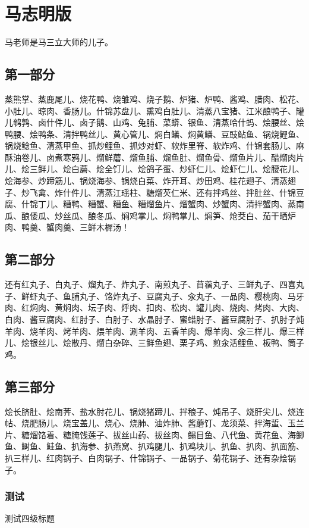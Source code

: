 \section{马志明版}
马老师是马三立大师的儿子。
\subsection{第一部分}
蒸熊掌、蒸鹿尾儿、烧花鸭、烧雏鸡、烧子鹅、炉猪、炉鸭、酱鸡、腊肉、松花、小肚儿、晾肉、香肠儿。什锦苏盘儿、熏鸡白肚儿、清蒸八宝猪、江米酿鸭子、罐儿鹌鹑、卤什件儿、卤子鹅、山鸡、兔脯、菜蟒、银鱼、清蒸哈什蚂、烩腰丝、烩鸭腰、烩鸭条、清拌鸭丝儿、黄心管儿、焖白鳝、焖黄鳝、豆豉鲇鱼、锅烧鲤鱼、锅烧鲶鱼、清蒸甲鱼、抓炒鲤鱼、抓炒对虾、软炸里脊、软炸鸡、什锦套肠儿、麻酥油卷儿、卤煮寒鸦儿、熘鲜蘑、熘鱼脯、熘鱼肚、熘鱼骨、熘鱼片儿、醋熘肉片儿、烩三鲜儿、烩白蘑、烩全饤儿、烩鸽子蛋、炒虾仁儿、烩虾仁儿、烩腰花儿、烩海参、炒蹄筋儿、锅烧海参、锅烧白菜、炸开耳、炒田鸡、桂花翅子、清蒸翅子、炒飞禽、炸什件儿、清蒸江瑶柱、糖熘芡仁米、还有拌鸡丝、拌肚丝、什锦豆腐、什锦丁儿、糟鸭、糟蟹、糟鱼、糟熘鱼片、熘蟹肉、炒蟹肉、清拌蟹肉、蒸南瓜、酿倭瓜、炒丝瓜、酿冬瓜、焖鸡掌儿、焖鸭掌儿、焖笋、炝茭白、茄干晒炉肉、鸭羹、蟹肉羹、三鲜木樨汤！

\subsection{第二部分}
还有红丸子、白丸子、熘丸子、炸丸子、南煎丸子、苜蓿丸子、三鲜丸子、四喜丸子、鲜虾丸子、鱼脯丸子、饹炸丸子、豆腐丸子、汆丸子、一品肉、樱桃肉、马牙肉、红焖肉、黄焖肉、坛子肉、烀肉、扣肉、松肉、罐儿肉、烧肉、烤肉、大肉、白肉、酱豆腐肉、红肘子、白肘子、水晶肘子、蜜蜡肘子、酱豆腐肘子、扒肘子炖羊肉、烧羊肉、烤羊肉、煨羊肉、涮羊肉、五香羊肉、爆羊肉、汆三样儿、爆三样儿、烩银丝儿、烩散丹、熘白杂碎、三鲜鱼翅、栗子鸡、煎汆活鲤鱼、板鸭、筒子鸡。

\subsection{第三部分}
烩长脐肚、烩南荠、盐水肘花儿、锅烧猪蹄儿、拌稂子、炖吊子、烧肝尖儿、烧连帖、烧肥肠儿、烧宝盖儿、烧心、烧肺、油炸肺、酱蘑饤、龙须菜、拌海蜇、玉兰片、糖熘饹着、糖腌饯莲子、拔丝山药、拔丝肉、鳎目鱼、八代鱼、黄花鱼、海鲫鱼、鲥鱼、鲑鱼、扒海参、扒燕窝、扒鸡腿儿、扒鸡块儿、扒鱼、扒肉、扒面筋、扒三样儿、红肉锅子、白肉锅子、什锦锅子、一品锅子、菊花锅子、还有杂烩锅子。

\subsubsection{测试}
测试四级标题
